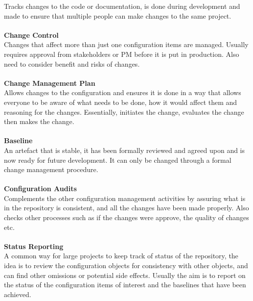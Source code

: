 \documentclass[a4paper,10pt]{article}
\begin{document}
Tracks changes to the code or documentation, is done during development and made to ensure that multiple people can make changes to the same project. \\\\
\textcolor{BlueGreen}{\textbf{Change Control}} \\
Changes that affect more than just one configuration items are managed. Usually requires approval from stakeholders or PM before it is put in production. Also need to consider benefit and risks of changes. \\\\
\textcolor{BlueGreen}{\textbf{Change Management Plan}} \\ 
Allows changes to the configuration and ensures it is done in a way that allows everyone to be aware of what needs to be done, how it would affect them and reasoning for the changes. Essentially, initiates the change, evaluates the change then makes the change. \\\\
\textcolor{BlueGreen}{\textbf{Baseline}} \\ 
An artefact that is stable, it has been formally reviewed and agreed upon and is now ready for future development. It can only be changed through a formal change management procedure. \\\\
\textcolor{BlueGreen}{\textbf{Configuration Audits}} \\
Complements the other configuration management activities by assuring what is in the repository is consistent, and all the changes have been made properly. Also checks other processes such as if the changes were approve, the quality of changes etc. \\\\  
\textcolor{BlueGreen}{\textbf{Status Reporting}} \\ 
A common way for large projects to keep track of status of the repository, the idea is to review the configuration objects for consistency with other objects, and can find other omissions or potential side effects. Usually the aim is to report on the status of the configuration items of interest and the baselines that have been achieved. \\\\
\textcolor{BlueGreen}{\textbf{}}
\textcolor{BlueGreen}{\textbf{}}
\textcolor{BlueGreen}{\textbf{}}
\textcolor{BlueGreen}{\textbf{}}
\end{document}
